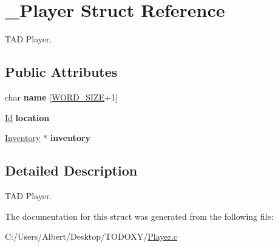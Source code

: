 \hypertarget{struct___player}{\section{\-\_\-\-Player Struct Reference}
\label{struct___player}
}


T\-A\-D Player.  


\subsection*{Public Attributes}
\begin{DoxyCompactItemize}
\item 
\hypertarget{struct___player_ac89715f913cc607b75eb7236765c41f5}{char {\bfseries name} \mbox{[}\hyperlink{_types_8h_a92ed8507d1cd2331ad09275c5c4c1c89}{W\-O\-R\-D\-\_\-\-S\-I\-Z\-E}+1\mbox{]}}\label{struct___player_ac89715f913cc607b75eb7236765c41f5}

\item 
\hypertarget{struct___player_adbb6195d15b88f3f658e74274eff52d8}{\hyperlink{_types_8h_a845e604fb28f7e3d97549da3448149d3}{Id} {\bfseries location}}\label{struct___player_adbb6195d15b88f3f658e74274eff52d8}

\item 
\hypertarget{struct___player_a5e02924cb82ca61f74ba414d190aa29b}{\hyperlink{_inventory_8h_a2253bf64ac4ce6a9c1d6f39c0b0d32a3}{Inventory} $\ast$ {\bfseries inventory}}\label{struct___player_a5e02924cb82ca61f74ba414d190aa29b}

\end{DoxyCompactItemize}


\subsection{Detailed Description}
T\-A\-D Player. 


\begin{DoxyItemize}
\item 
\end{DoxyItemize}

The documentation for this struct was generated from the following file\-:\begin{DoxyCompactItemize}
\item 
C\-:/\-Users/\-Albert/\-Desktop/\-T\-O\-D\-O\-X\-Y/\hyperlink{_player_8c}{Player.\-c}\end{DoxyCompactItemize}
